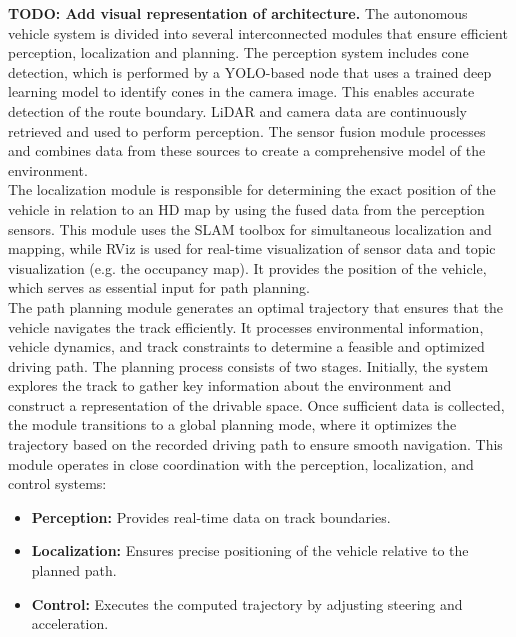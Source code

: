 \textbf{TODO: Add visual representation of architecture.} The autonomous vehicle system is divided into several interconnected modules that ensure efficient perception, localization and planning. 
The perception system includes cone detection, which is performed by a YOLO-based node that uses a trained deep learning model to identify cones in the camera image. This enables accurate detection of the route boundary. 
LiDAR and camera data are continuously retrieved and used to perform perception. The sensor fusion module processes and combines data from these sources to create a comprehensive model of the environment.\\
\newline
The localization module is responsible for determining the exact position of the vehicle in relation to an HD map by using the fused data from the perception sensors. 
This module uses the SLAM toolbox for simultaneous localization and mapping, while RViz is used for real-time visualization of sensor data and topic visualization (e.g. the occupancy map). It provides the position of the vehicle, which serves as essential input for path planning.\\
\newline
The path planning module generates an optimal trajectory that ensures that the vehicle navigates the track efficiently. It processes environmental information, vehicle dynamics, and track constraints to determine a feasible and optimized driving path.
The planning process consists of two stages. Initially, the system explores the track to gather key information about the environment and construct a representation of the drivable space. Once sufficient data is collected, the module transitions to a global planning mode, where it optimizes the trajectory based on the recorded driving path to ensure smooth navigation. 
This module operates in close coordination with the perception, localization, and control systems:
\begin{itemize}
    \item \textbf{Perception:} Provides real-time data on track boundaries.
    \item \textbf{Localization:} Ensures precise positioning of the vehicle relative to the planned path.
    \item \textbf{Control:} Executes the computed trajectory by adjusting steering and acceleration.
\end{itemize}
